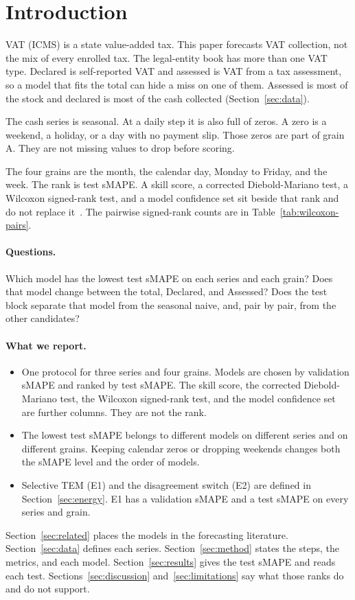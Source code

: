 \section{Introduction}
\label{sec:intro}

VAT (ICMS) is a state value-added tax.
This paper forecasts VAT collection, not the mix of every enrolled tax.
The legal-entity book has more than one VAT type.
Declared is self-reported VAT and assessed is VAT from a tax assessment, so a model that fits the total can hide a miss on one of them.
Assessed is most of the stock and declared is most of the cash collected (Section~\ref{sec:data}).

The cash series is seasonal.
At a daily step it is also full of zeros.
A zero is a weekend, a holiday, or a day with no payment slip.
Those zeros are part of grain A.
They are not missing values to drop before scoring.

The four grains are the month, the calendar day, Monday to Friday, and the week.
The rank is test sMAPE.
A skill score, a corrected Diebold-Mariano test, a Wilcoxon signed-rank test, and a model confidence set sit beside that rank and do not replace it~\citep{diebold1995comparing,harvey1997testing,wilcoxon1945individual,hansen2011mcs}.
The pairwise signed-rank counts are in Table~\ref{tab:wilcoxon-pairs}.

\paragraph{Questions.}
Which model has the lowest test sMAPE on each series and each grain?
Does that model change between the total, Declared, and Assessed?
Does the test block separate that model from the seasonal naive, and, pair by pair, from the other candidates?

\paragraph{What we report.}
\begin{itemize}
  \item One protocol for three series and four grains.
        Models are chosen by validation sMAPE and ranked by test sMAPE.
        The skill score, the corrected Diebold-Mariano test, the Wilcoxon signed-rank test, and the model confidence set are further columns.
        They are not the rank.
  \item The lowest test sMAPE belongs to different models on different series and on different grains.
        Keeping calendar zeros or dropping weekends changes both the sMAPE level and the order of models.
  \item Selective TEM (E1) and the disagreement switch (E2) are defined in Section~\ref{sec:energy}.
        E1 has a validation sMAPE and a test sMAPE on every series and grain.
\end{itemize}

Section~\ref{sec:related} places the models in the forecasting literature.
Section~\ref{sec:data} defines each series.
Section~\ref{sec:method} states the steps, the metrics, and each model.
Section~\ref{sec:results} gives the test sMAPE and reads each test.
Sections~\ref{sec:discussion} and~\ref{sec:limitations} say what those ranks do and do not support.
